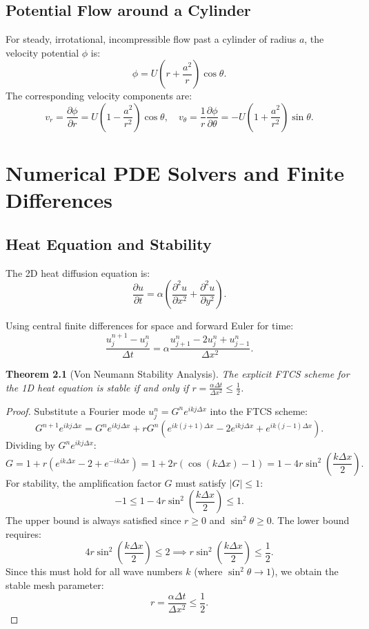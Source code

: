 \documentclass[11pt,a4paper,twoside]{book}
\theoremstyle{eulerstyle}
\newtheorem{theorem}{Theorem}[chapter]
\theoremstyle{definition}
\begin{document}
\section{Potential Flow around a Cylinder}
For steady, irrotational, incompressible flow past a cylinder of radius $a$, the velocity potential $\phi$ is:
\[
\phi = U \left(r + \frac{a^2}{r}\right) \cos\theta.
\]
The corresponding velocity components are:
\[
v_r = \frac{\partial \phi}{\partial r} = U \left(1 - \frac{a^2}{r^2}\right) \cos\theta, \quad v_\theta = \frac{1}{r}\frac{\partial \phi}{\partial \theta} = -U \left(1 + \frac{a^2}{r^2}\right) \sin\theta.
\]

\cleardoublepage

\chapter{Numerical PDE Solvers and Finite Differences}
\label{ch:pdes}

\section{Heat Equation and Stability}
The 2D heat diffusion equation is:
\[
\frac{\partial u}{\partial t} = \alpha \left(\frac{\partial^2 u}{\partial x^2} + \frac{\partial^2 u}{\partial y^2}\right).
\]

Using central finite differences for space and forward Euler for time:
\[
\frac{u_j^{n+1} - u_j^n}{\Delta t} = \alpha \frac{u_{j+1}^n - 2u_j^n + u_{j-1}^n}{\Delta x^2}.
\]

\begin{theorem}[Von Neumann Stability Analysis]
The explicit FTCS scheme for the 1D heat equation is stable if and only if $r = \frac{\alpha \Delta t}{\Delta x^2} \le \frac{1}{2}$.
\end{theorem}
\begin{proof}
Substitute a Fourier mode $u_j^n = G^n e^{i k j \Delta x}$ into the FTCS scheme:
\[
G^{n+1} e^{i k j \Delta x} = G^n e^{i k j \Delta x} + r G^n \left( e^{i k (j+1) \Delta x} - 2e^{i k j \Delta x} + e^{i k (j-1) \Delta x} \right).
\]
Dividing by $G^n e^{i k j \Delta x}$:
\[
G = 1 + r \left( e^{i k \Delta x} - 2 + e^{-i k \Delta x} \right) = 1 + 2r \left( \cos(k \Delta x) - 1 \right) = 1 - 4r \sin^2\left(\frac{k \Delta x}{2}\right).
\]
For stability, the amplification factor $G$ must satisfy $|G| \le 1$:
\[
-1 \le 1 - 4r \sin^2\left(\frac{k \Delta x}{2}\right) \le 1.
\]
The upper bound is always satisfied since $r \ge 0$ and $\sin^2\theta \ge 0$. The lower bound requires:
\[
4r \sin^2\left(\frac{k \Delta x}{2}\right) \le 2 \implies r \sin^2\left(\frac{k \Delta x}{2}\right) \le \frac{1}{2}.
\]
Since this must hold for all wave numbers $k$ (where $\sin^2\theta \to 1$), we obtain the stable mesh parameter:
\[
r = \frac{\alpha \Delta t}{\Delta x^2} \le \frac{1}{2}.
\]
\end{proof}
\end{document}
